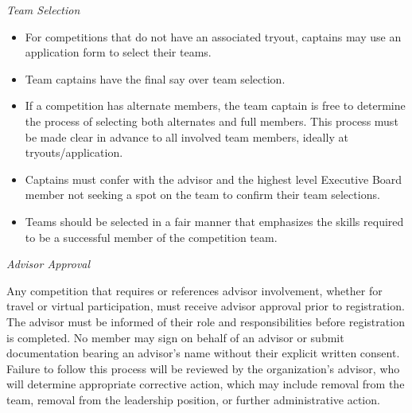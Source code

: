 \documentclass[12pt]{article}
\begin{document}
\textit{Team Selection}
\begin{itemize}
  \item For competitions that do not have an associated tryout, captains may use an application form to select their teams.
  \item Team captains have the final say over team selection.
  \item If a competition has alternate members, the team captain is free to determine the process of selecting both alternates and full members. This process must be made clear in advance to all involved team members, ideally at tryouts/application.
  \item Captains must confer with the advisor and the highest level Executive Board member not seeking a spot on the team to confirm their team selections.
  \item Teams should be selected in a fair manner that emphasizes the skills required to be a successful member of the competition team.
\end{itemize}

\textit{Advisor Approval}

Any competition that requires or references advisor involvement, whether for travel or virtual participation, must receive advisor approval prior to registration. The advisor must be informed of their role and responsibilities before registration is completed. No member may sign on behalf of an advisor or submit documentation bearing an advisor's name without their explicit written consent. Failure to follow this process will be reviewed by the organization's advisor, who will determine appropriate corrective action, which may include removal from the team, removal from the leadership position, or further administrative action.
\end{document}
